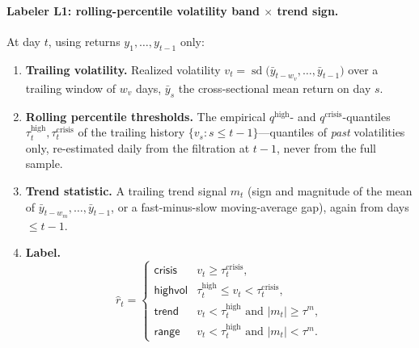 \paragraph{Labeler L1: rolling-percentile volatility band $\times$ trend sign.}
At day $t$, using returns $y_1, \ldots, y_{t-1}$ only:
\begin{enumerate}
  \item \textbf{Trailing volatility.} Realized volatility
        $v_t = \operatorname{sd}\bigl(\bar y_{t-w_v}, \ldots, \bar y_{t-1}\bigr)$
        over a trailing window of $w_v$ days, $\bar y_s$ the cross-sectional
        mean return on day $s$.
  \item \textbf{Rolling percentile thresholds.} The empirical
        $q^{\text{high}}$- and $q^{\text{crisis}}$-quantiles
        $\tau^{\text{high}}_t, \tau^{\text{crisis}}_t$ of the trailing
        history $\{v_s : s \le t-1\}$---quantiles of \emph{past}
        volatilities only, re-estimated daily from the filtration at $t-1$,
        never from the full sample.
  \item \textbf{Trend statistic.} A trailing trend signal $m_t$ (sign and
        magnitude of the mean of $\bar y_{t-w_m}, \ldots, \bar y_{t-1}$, or
        a fast-minus-slow moving-average gap), again from days $\le t-1$.
  \item \textbf{Label.}
        \[
        \hat r_t =
        \begin{cases}
          \textsf{crisis} & v_t \ge \tau^{\text{crisis}}_t, \\
          \textsf{highvol} & \tau^{\text{high}}_t \le v_t < \tau^{\text{crisis}}_t, \\
          \textsf{trend} & v_t < \tau^{\text{high}}_t \text{ and } |m_t| \ge \tau^{m}, \\
          \textsf{range} & v_t < \tau^{\text{high}}_t \text{ and } |m_t| < \tau^{m}.
        \end{cases}
        \]
\end{enumerate}

